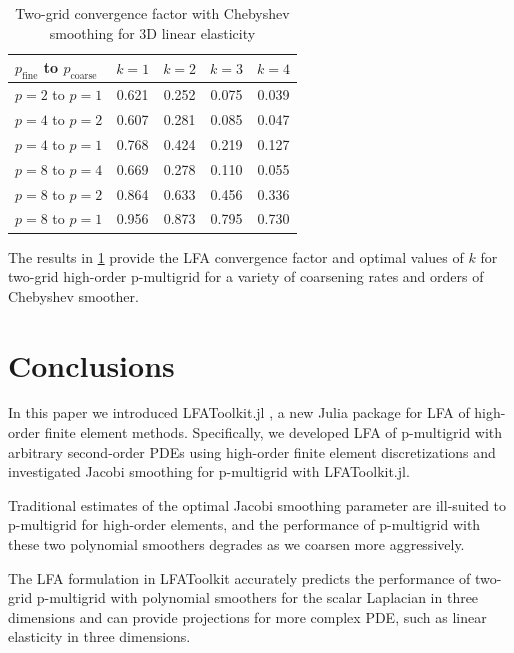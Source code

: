 \documentclass[review]{siamart190516}
\begin{document}
\begin{table}[ht!]
\begin{center}
\begin{tabular}{l c c c c}
  \toprule
  $p_{\text{fine}}$ to $p_{\text{coarse}}$  &  $k = 1$   &  $k = 2$   &  $k = 3$   &  $k = 4$   \\
  \toprule
  $p = 2$ to $p = 1$   &  0.621  &  0.252  &  0.075  &  0.039  \\
  \midrule
  $p = 4$ to $p = 2$   &  0.607  &  0.281  &  0.085  &  0.047  \\
  $p = 4$ to $p = 1$   &  0.768  &  0.424  &  0.219  &  0.127  \\
  \midrule
  $p = 8$ to $p = 4$   &  0.669  &  0.278  &  0.110  &  0.055  \\
  $p = 8$ to $p = 2$   &  0.864  &  0.633  &  0.456  &  0.336  \\
  $p = 8$ to $p = 1$   &  0.956  &  0.873  &  0.795  &  0.730  \\
  \bottomrule
\end{tabular}
\end{center}
\caption{Two-grid convergence factor with Chebyshev smoothing for 3D linear elasticity}
\label{table:two_grid_3d_linear_elasticity}
\end{table}

The results in \cref{table:two_grid_3d_linear_elasticity} provide the LFA convergence factor and optimal values of $k$ for two-grid high-order p-multigrid for a variety of coarsening rates and orders of Chebyshev smoother.

\section{Conclusions}\label{sec:conclusion}

In this paper we introduced LFAToolkit.jl \cite{thompson2021toolkit}, a new Julia package for LFA of high-order finite element methods.
Specifically, we developed LFA of p-multigrid with arbitrary second-order PDEs using high-order finite element discretizations and investigated Jacobi smoothing for p-multigrid with LFAToolkit.jl.

Traditional estimates of the optimal Jacobi smoothing parameter are ill-suited to p-multigrid for high-order elements, and the performance of p-multigrid with these two polynomial smoothers degrades as we coarsen more aggressively.

The LFA formulation in LFAToolkit accurately predicts the performance of two-grid p-multigrid with polynomial smoothers for the scalar Laplacian in three dimensions and can provide projections for more complex PDE, such as linear elasticity in three dimensions.



\end{document}
